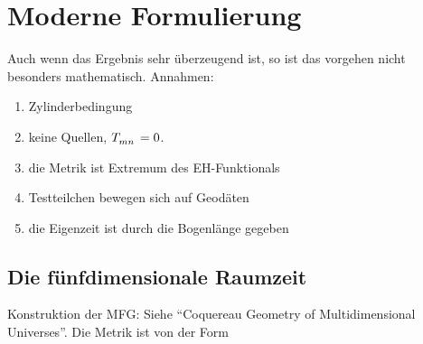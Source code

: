 \chapter{Moderne Formulierung}
Auch wenn das Ergebnis sehr überzeugend ist, so ist das vorgehen nicht besonders
mathematisch. Annahmen:
\begin{enumerate}
\item Zylinderbedingung
\item keine Quellen, $\tensor{T}{_m_n}=0$.
\item die Metrik ist Extremum des EH-Funktionals
\item Testteilchen bewegen sich auf Geodäten
\item die Eigenzeit ist durch die Bogenlänge gegeben
\end{enumerate}
\section{Die fünfdimensionale Raumzeit}
Konstruktion der MFG: Siehe "`Coquereau Geometry of Multidimensional
Universes"'\cite{coquereaux1983geometry}.
Die Metrik ist von der Form
